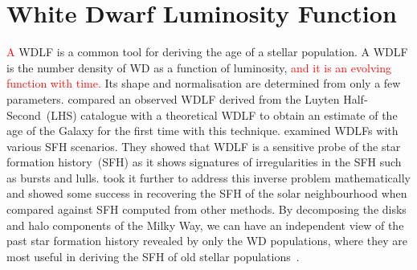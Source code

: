 \documentclass[fleqn,usenatbib]{rasti}
\begin{document}
\section{White Dwarf Luminosity Function}
\textcolor{red}{A} WDLF is a common tool for deriving the age of a stellar population. A WDLF is
the number density of WD as a function of luminosity, \textcolor{red}{and it is
an evolving function with time.} Its shape and normalisation are determined
from only a few parameters. \citet{1987ApJ...315L..77W} compared an observed 
WDLF derived from the Luyten Half-Second~(LHS) catalogue with a theoretical
WDLF to obtain an estimate of the age of the Galaxy for the first time with
this technique. \citet{1990ApJ...352..605N} examined WDLFs with various SFH
scenarios. They showed that WDLF is a sensitive probe of the star formation
history~(SFH) as it shows signatures of irregularities in the SFH such as bursts
and lulls. \citet{2013MNRAS.434.1549R} took it further to address this inverse
problem mathematically and showed some success in recovering the SFH of the
solar neighbourhood when compared against SFH computed from other methods. By
decomposing the disks and halo components of the Milky Way, we can have an
independent view of the past star formation history revealed by only the
WD populations, where they are most useful in deriving the SFH of old
stellar populations~\citep{2011MNRAS.417...93R, 2017ASPC..509...25L}.
\end{document}
